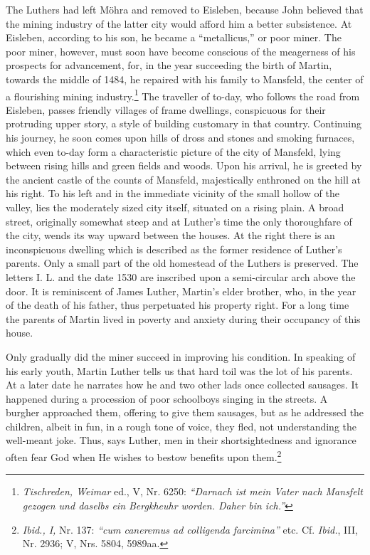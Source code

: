 The Luthers had left Möhra and removed to Eisleben, because John
believed that the mining industry of the latter city would afford
him a better subsistence. At Eisleben, according to his son, he
became a “metallicus,” or poor miner. The poor miner, however,
must soon have become conscious of the meagerness of his prospects
for advancement, for, in the year succeeding the birth of Martin,
towards the middle of 1484, he repaired with his family to Mansfeld,
the center of a flourishing mining industry.\footnote{
\textit{Tischreden, Weimar} ed., V, Nr. 6250: \textit{“Darnach ist mein Vater nach Mansfelt gezogen und daselbs ein Bergkheuhr worden. Daher bin ich.”}
}
The traveller of to-day,
who follows the road from Eisleben, passes friendly villages of frame
dwellings, conspicuous for their protruding upper story, a style of
building customary in that country. Continuing his journey, he soon
comes upon hills of dross and stones and smoking furnaces, which
even to-day form a characteristic picture of the city of Mansfeld,
lying between rising hills and green fields and woods. Upon his arrival,
he is greeted by the ancient castle of the counts of Mansfeld,
majestically enthroned on the hill at his right. To his left and in the
immediate vicinity of the small hollow of the valley, lies the moderately
sized city itself, situated on a rising plain. A broad street,
originally somewhat steep and at Luther’s time the only thoroughfare of the city,
wends its way upward between the houses. At the
right there is an inconspicuous dwelling which is described as the
former residence of Luther’s parents. Only a small part of the old
homestead of the Luthers is preserved. The letters I. L. and the date
1530 are inscribed upon a semi-circular arch above the door. It is
reminiscent of James Luther, Martin’s elder brother, who, in the
year of the death of his father, thus perpetuated his property right.
For a long time the parents of Martin lived in poverty and anxiety
during their occupancy of this house.

Only gradually did the miner succeed in improving his condition.
In speaking of his early youth, Martin Luther tells us that hard toil
was the lot of his parents. At a later date he narrates how he and two
other lads once collected sausages. It happened during a procession of
poor schoolboys singing in the streets. A burgher approached them,
offering to give them sausages, but as he addressed the children,
albeit in fun, in a rough tone of voice, they fled, not understanding
the well-meant joke. Thus, says Luther, men in their shortsightedness
and ignorance often fear God when He wishes to bestow benefits
upon them.\footnote
{\textit{Ibid., I,} Nr. 137: \textit{“cum caneremus ad colligenda farcimina”} etc. Cf. \textit{Ibid.}, III, Nr. 2936;
V, Nrs. 5804, 5989aa.}

